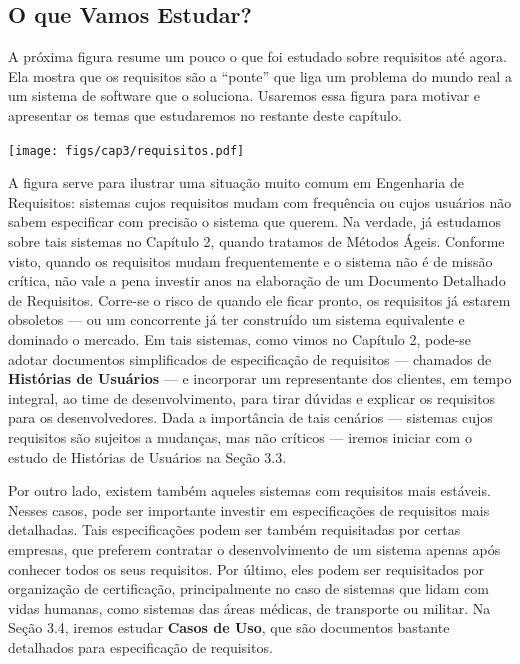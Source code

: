 \documentclass[
  11pt,
  twoside]{book}
\let\origfigure\figure
\let\endorigfigure\endfigure
\renewenvironment{figure}[1][2] {
    \expandafter\origfigure\expandafter[!h]
} {
    \endorigfigure
}
\begin{document}
\hypertarget{o-que-vamos-estudar}{%
\subsection{O que Vamos Estudar?}\label{o-que-vamos-estudar}}

A próxima figura resume um pouco o que foi estudado sobre requisitos até
agora. Ela mostra que os requisitos são a ``ponte'' que liga um problema
do mundo real a um sistema de software que o soluciona. Usaremos essa
figura para motivar e apresentar os temas que estudaremos no restante
deste capítulo.

\begin{figure}
\centering
\texttt{[image: figs/cap3/requisitos.pdf]}
\caption{Requisitos são a ``ponte'' que liga um problema do mundo real a
um sistema de software que o soluciona.}
\end{figure}

A figura serve para ilustrar uma situação muito comum em Engenharia de
Requisitos: sistemas cujos requisitos mudam com frequência ou cujos
usuários não sabem especificar com precisão o sistema que querem. Na
verdade, já estudamos sobre tais sistemas no Capítulo 2, quando tratamos
de Métodos Ágeis. Conforme visto, quando os requisitos mudam
frequentemente e o sistema não é de missão crítica, não vale a pena
investir anos na elaboração de um Documento Detalhado de Requisitos.
Corre-se o risco de quando ele ficar pronto, os requisitos já estarem
obsoletos --- ou um concorrente já ter construído um sistema equivalente
e dominado o mercado. Em tais sistemas, como vimos no Capítulo 2,
pode-se adotar documentos simplificados de especificação de requisitos
--- chamados de \textbf{Histórias de Usuários} --- e incorporar um
representante dos clientes, em tempo integral, ao time de
desenvolvimento, para tirar dúvidas e explicar os requisitos para os
desenvolvedores. Dada a importância de tais cenários --- sistemas cujos
requisitos são sujeitos a mudanças, mas não críticos --- iremos iniciar
com o estudo de Histórias de Usuários na Seção 3.3.

Por outro lado, existem também aqueles sistemas com requisitos mais
estáveis. Nesses casos, pode ser importante investir em especificações
de requisitos mais detalhadas. Tais especificações podem ser também
requisitadas por certas empresas, que preferem contratar o
desenvolvimento de um sistema apenas após conhecer todos os seus
requisitos. Por último, eles podem ser requisitados por organização de
certificação, principalmente no caso de sistemas que lidam com vidas
humanas, como sistemas das áreas médicas, de transporte ou militar. Na
Seção 3.4, iremos estudar \textbf{Casos de Uso}, que são documentos
bastante detalhados para especificação de requisitos.
\end{document}
